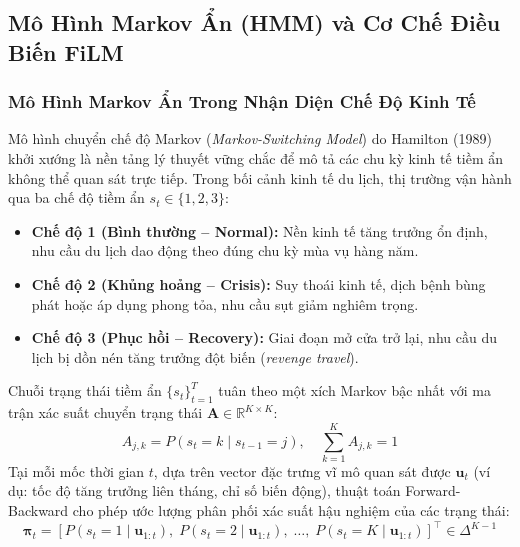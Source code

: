 \subsection{Mô Hình Markov Ẩn (HMM) và Cơ Chế Điều Biến FiLM}
\subsubsection{Mô Hình Markov Ẩn Trong Nhận Diện Chế Độ Kinh Tế}
Mô hình chuyển chế độ Markov (\textit{Markov-Switching Model}) do Hamilton (1989) \cite{hamilton1989regime} khởi xướng là nền tảng lý thuyết vững chắc để mô tả các chu kỳ kinh tế tiềm ẩn không thể quan sát trực tiếp. Trong bối cảnh kinh tế du lịch, thị trường vận hành qua ba chế độ tiềm ẩn $s_t \in \{1, 2, 3\}$:
\begin{itemize}
    \item \textbf{Chế độ 1 (Bình thường -- Normal):} Nền kinh tế tăng trưởng ổn định, nhu cầu du lịch dao động theo đúng chu kỳ mùa vụ hàng năm.
    \item \textbf{Chế độ 2 (Khủng hoảng -- Crisis):} Suy thoái kinh tế, dịch bệnh bùng phát hoặc áp dụng phong tỏa, nhu cầu sụt giảm nghiêm trọng.
    \item \textbf{Chế độ 3 (Phục hồi -- Recovery):} Giai đoạn mở cửa trở lại, nhu cầu du lịch bị dồn nén tăng trưởng đột biến (\textit{revenge travel}).
\end{itemize}

Chuỗi trạng thái tiềm ẩn $\{s_t\}_{t=1}^T$ tuân theo một xích Markov bậc nhất với ma trận xác suất chuyển trạng thái $\mathbf{A} \in \mathbb{R}^{K \times K}$:
\begin{equation}
    A_{j, k} = P(s_t = k \mid s_{t-1} = j), \quad \sum_{k=1}^K A_{j, k} = 1
\end{equation}
Tại mỗi mốc thời gian $t$, dựa trên vector đặc trưng vĩ mô quan sát được $\mathbf{u}_t$ (ví dụ: tốc độ tăng trưởng liên tháng, chỉ số biến động), thuật toán Forward-Backward cho phép ước lượng phân phối xác suất hậu nghiệm của các trạng thái:
\begin{equation}
    \bm{\pi}_t = \left[ P(s_t = 1 \mid \mathbf{u}_{1:t}), \; P(s_t = 2 \mid \mathbf{u}_{1:t}), \; \dots, \; P(s_t = K \mid \mathbf{u}_{1:t}) \right]^\top \in \Delta^{K-1}
\end{equation}

